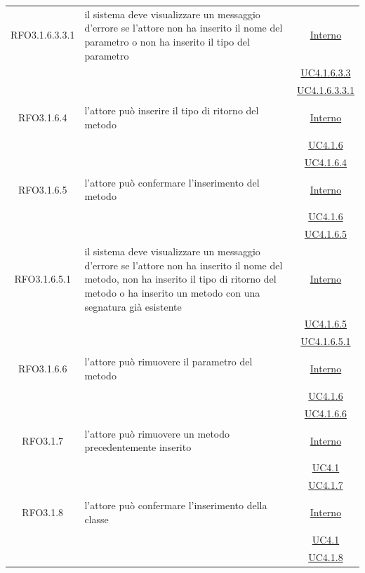 \begin{longtable}{|c|>{\centering}m{7cm}|c|}
\hypertarget{RFO3.1.6.3.3.1}{RFO3.1.6.3.3.1} & il sistema deve visualizzare un messaggio d'errore se l'attore non ha inserito il nome del parametro o non ha inserito il tipo del parametro &  \hyperlink{Interno}{Interno}\\
& &\hyperref[UC4.1.6.3.3]{UC4.1.6.3.3}\\
& &\hyperref[UC4.1.6.3.3.1]{UC4.1.6.3.3.1}\\ \hline

\hypertarget{RFO3.1.6.4}{RFO3.1.6.4} & l'attore può inserire il tipo di ritorno del metodo &  \hyperlink{Interno}{Interno}\\
& &\hyperref[UC4.1.6]{UC4.1.6}\\
& &\hyperref[UC4.1.6.4]{UC4.1.6.4}\\ \hline

\hypertarget{RFO3.1.6.5}{RFO3.1.6.5} & l'attore può confermare l'inserimento del metodo & \hyperlink{Interno}{Interno}\\
& &\hyperref[UC4.1.6]{UC4.1.6}\\
& &\hyperref[UC4.1.6.5]{UC4.1.6.5}\\ \hline

\hypertarget{RFO3.1.6.5.1}{RFO3.1.6.5.1} & il sistema deve visualizzare un messaggio d'errore se l'attore non ha inserito il nome del metodo, non ha inserito il tipo di ritorno del metodo o ha inserito un metodo con una segnatura già esistente & \hyperlink{Interno}{Interno}\\
& &\hyperref[UC4.1.6.5]{UC4.1.6.5}\\
& &\hyperref[UC4.1.6.5.1]{UC4.1.6.5.1}\\ \hline

\hypertarget{RFO3.1.6.6}{RFO3.1.6.6} & l'attore può rimuovere il parametro del metodo & \hyperlink{Interno}{Interno}\\
& &\hyperref[UC4.1.6]{UC4.1.6}\\
& &\hyperref[UC4.1.6.6]{UC4.1.6.6}\\ \hline

\hypertarget{RFO3.1.7}{RFO3.1.7} & l'attore può rimuovere un metodo precedentemente inserito & \hyperlink{Interno}{Interno}\\
& &\hyperref[UC4.1]{UC4.1}\\
& &\hyperref[UC4.1.7]{UC4.1.7}\\ \hline

\hypertarget{RFO3.1.8}{RFO3.1.8} & l'attore può confermare l'inserimento della classe & \hyperlink{Interno}{Interno}\\
& &\hyperref[UC4.1]{UC4.1}\\
& &\hyperref[UC4.1.8]{UC4.1.8}\\ \hline


\end{longtable}
